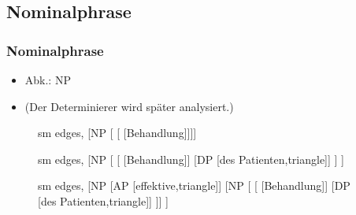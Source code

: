 \subsection{Nominalphrase}

\begin{frame}
\frametitle{Nominalphrase}

\begin{itemize}
	\item Abk.: NP
	\item (Der Determinierer wird später analysiert.)
\end{itemize}

\begin{figure}[b]
	\begin{minipage}[b]{0.18\textwidth}
	\centering
	\footnotesize{
		\begin{forest}
		sm edges,
		[NP [ [ [Behandlung]]]]
		\end{forest}
		}
  	\end{minipage}  
  	\pause            
	\begin{minipage}[b]{0.03\textwidth}
	\hfill
  	\end{minipage}
  	\begin{minipage}[b]{0.30\textwidth}
	\centering
	\footnotesize{
		\begin{forest}
		sm edges,
		[NP [	[ [Behandlung]]
					 	[DP [des Patienten,triangle]]
			]
		]			 
		\end{forest}
		}
  	\end{minipage}  
	\begin{minipage}[b]{0.03\textwidth}
	\hfill
  	\end{minipage}
  	\pause            
	\begin{minipage}[b]{0.41\textwidth}
	\centering
	\footnotesize{
		\begin{forest}
		sm edges,
		[NP [AP [effektive,triangle]]
			[NP 
		    [	[ [Behandlung]]
					 	[DP [des Patienten,triangle]]
			]]
		]			 
		\end{forest}
		}
  	\end{minipage}
\end{figure}
\end{frame}


